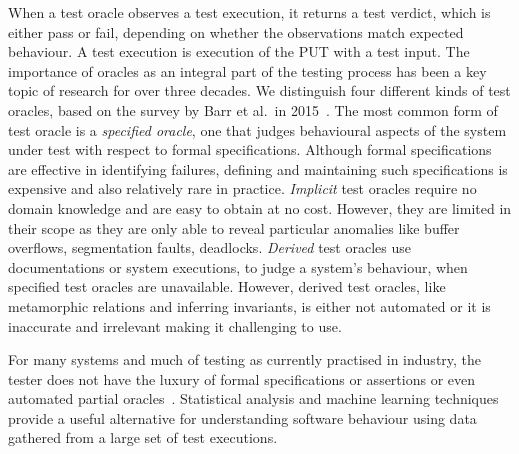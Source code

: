When a test oracle observes a test execution, it returns a
test verdict, which is either pass or fail, depending on whether the observations match 
expected behaviour. A test execution is execution of the PUT with a test input. The importance of oracles as an integral part of the testing process has been a key topic of research for over three decades. 
We distinguish four different kinds of test oracles,
based on the survey by Barr et al.~in 2015~\cite{barr2015oracle}. The most common form of test oracle is a \emph{specified oracle},
one that judges behavioural aspects of the system under test
with respect to formal specifications. Although formal specifications are effective in identifying failures,  
defining and maintaining such specifications is expensive
and also relatively rare in practice.
\emph{Implicit} test oracles require no domain knowledge and 
are easy to obtain at no cost. However, they are
limited in their scope as they are only able to reveal  particular anomalies like buffer overflows, segmentation faults, deadlocks. 
\emph{Derived} test oracles use 
documentations or system executions, to judge a system's behaviour,
when specified test oracles are unavailable. 
However, derived test oracles, like metamorphic relations and inferring invariants, is either not automated  
or it is inaccurate and irrelevant making it challenging to use.

For many systems and much of
testing as currently practised in industry, the
tester does not have the luxury of formal specifications or assertions or even automated partial
oracles~\cite{hierons2009verdict, hierons2012oracles}. %
Statistical analysis and machine learning techniques provide a useful alternative for understanding software behaviour using data 
gathered from a large set of test executions.


